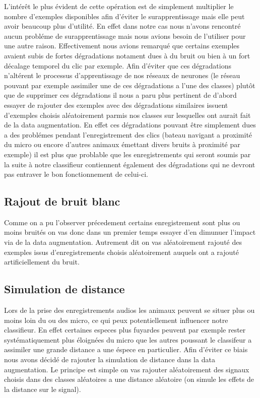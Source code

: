 L'intérêt le plus évident de cette opération est de simplement multiplier le nombre d'exemples disponibles afin d'éviter le surapprentissage mais elle peut avoir beaucoup plus d'utilité. En effet dans notre cas nous n'avons rencontré aucun probléme de surapprentissage mais nous avions besoin de l'utiliser pour une autre raison.
Effectivement nous avions remarqué que certains exemples avaient subis de fortes dégradations notament dues à du bruit ou bien à un fort décalage temporel du clic par exemple. Afin d'éviter que ces dégradations n'altérent le processus d'apprentissage de nos réseaux de neurones (le réseau pouvant par exemple assimiler une de ces dégradations a l'une des classes) plutôt que de supprimer ces dégradations il nous a paru plus pertinent de d'abord essayer de rajouter des exemples avec des dégradations similaires issuent d'exemples choisis aléatoirement parmis nos classes sur lesquelles ont aurait fait de la data augmentation. En effet ces dégradations pouvant être simplement dues a des problémes pendant l'enregistrement des clics (bateau navigant a proximité du micro ou encore d'autres animaux émettant divers bruits à proximité par exemple) il est plus que problable que les enregistrements qui seront soumis par la suite à notre classifieur contiennent également des dégradations qui ne devront pas entraver le bon fonctionnement de celui-ci.

\hypertarget{Rajout-de-bruit-blanc}{%
\subsection{Rajout de bruit blanc}
\label{Rajout-de-bruit-blanc}}

Comme on a pu l'observer précedement certains enregistrement sont plus ou moins bruités on vas donc dans un premier temps essayer d'en dimunuer l'impact via de la data augmentation. Autrement dit on vas aléatoirement rajouté des exemples issus d'enregistrements choisis aléatoirement auquels ont a rajouté artificiellement du bruit.

\hypertarget{Simulation-de-distance}{%
\subsection{Simulation de distance}
\label{Simulation-de-distance}}

Lors de la prise des enregistrements audios les animaux peuvent se situer plus ou moins loin du ou des micro, ce qui peux potentiellement influencer notre classifieur. En effet certaines especes plus fuyardes peuvent par exemple rester systématiquement plus éloignées du micro que les autres poussant le classifeur a assimiler une grande distance a une éspece en particulier.
Afin d'éviter ce biais nous avons décidé de rajouter la simulation de distance dans la data augmentation.
Le principe est simple on vas rajouter aléatoirement des signaux choisis dans des classes aléatoires a une distance aléatoire (on simule les effets de la distance sur le signal).


